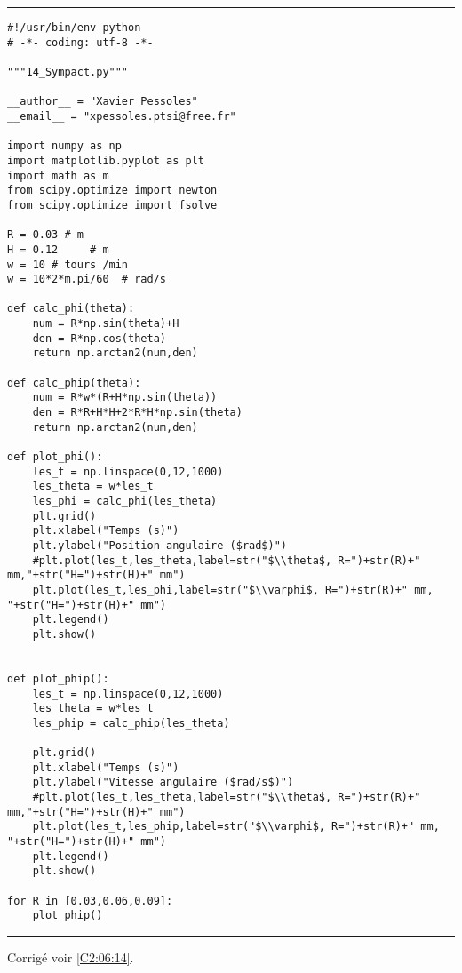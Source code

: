 \noindent\hrule
\begin{lstlisting}
#!/usr/bin/env python
# -*- coding: utf-8 -*-

"""14_Sympact.py"""

__author__ = "Xavier Pessoles"
__email__ = "xpessoles.ptsi@free.fr"

import numpy as np
import matplotlib.pyplot as plt
import math as m
from scipy.optimize import newton
from scipy.optimize import fsolve

R = 0.03 # m
H = 0.12     # m
w = 10 # tours /min
w = 10*2*m.pi/60  # rad/s

def calc_phi(theta):
    num = R*np.sin(theta)+H
    den = R*np.cos(theta)
    return np.arctan2(num,den)

def calc_phip(theta):
    num = R*w*(R+H*np.sin(theta))
    den = R*R+H*H+2*R*H*np.sin(theta)
    return np.arctan2(num,den)

def plot_phi():
    les_t = np.linspace(0,12,1000)
    les_theta = w*les_t
    les_phi = calc_phi(les_theta)
    plt.grid()
    plt.xlabel("Temps (s)")
    plt.ylabel("Position angulaire ($rad$)")
    #plt.plot(les_t,les_theta,label=str("$\\theta$, R=")+str(R)+" mm,"+str("H=")+str(H)+" mm")
    plt.plot(les_t,les_phi,label=str("$\\varphi$, R=")+str(R)+" mm, "+str("H=")+str(H)+" mm")
    plt.legend()
    plt.show()


def plot_phip():
    les_t = np.linspace(0,12,1000)
    les_theta = w*les_t
    les_phip = calc_phip(les_theta)
    
    plt.grid()
    plt.xlabel("Temps (s)")
    plt.ylabel("Vitesse angulaire ($rad/s$)")
    #plt.plot(les_t,les_theta,label=str("$\\theta$, R=")+str(R)+" mm,"+str("H=")+str(H)+" mm")
    plt.plot(les_t,les_phip,label=str("$\\varphi$, R=")+str(R)+" mm, "+str("H=")+str(H)+" mm")
    plt.legend()
    plt.show()

for R in [0.03,0.06,0.09]:
    plot_phip()
\end{lstlisting}
\noindent\hrule

\else
\fi


\ifprof
\else
\begin{flushright}
\footnotesize{Corrigé  voir \ref{C2:06:14}.}
\end{flushright}%
\fi